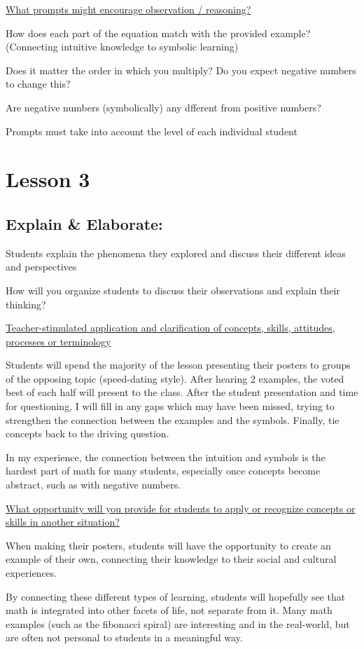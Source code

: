 \documentclass{notes}
\begin{document}
\ul{What prompts might encourage observation / reasoning?}

How does each part of the equation match with the provided example? (Connecting intuitive knowledge to symbolic learning)

Does it matter the order in which you multiply? Do you expect negative numbers to change this?

Are negative numbers (symbolically) any dfferent from positive numbers?

Prompts must take into account the level of each individual student

\section{Lesson 3}

\subsection{Explain \& Elaborate:}

Students explain the phenomena they explored and discuss their different
ideas and perspectives

How will you organize students to discuss their observations and explain their thinking?

\ul{Teacher-stimulated application and clarification of concepts, skills,
attitudes, processes or terminology}

Students will spend the majority of the lesson presenting their posters to groups of the opposing topic (speed-dating style). After hearing 2 examples, the voted best of each half will present to the class. After the student presentation and time for questioning, I will fill in any gaps which may have been missed, trying to strengthen the connection between the examples and the symbols. Finally, tie concepts back to the driving question.

\tab \indicates In my experience, the connection between the intuition and symbols is the hardest part of math for many students, especially once concepts become abstract, such as with negative numbers.

\ul{What opportunity will you provide for students to apply or recognize concepts or skills in another situation?}

When making their posters, students will have the opportunity to create an example of their own, connecting their knowledge to their social and cultural experiences.

\tab By connecting these different types of learning, students will hopefully see that math is integrated into other facets of life, not separate from it. Many math examples (such as the fibonacci spiral) are interesting and in the real-world, but are often not personal to students in a meaningful way.
\end{document}
